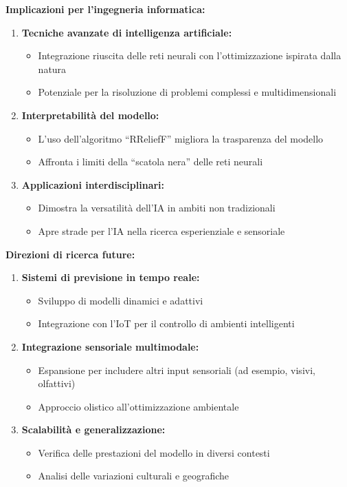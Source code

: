 \textbf{Implicazioni per l'ingegneria informatica:}
\begin{enumerate}
    \item \textbf{Tecniche avanzate di intelligenza artificiale:} 
    \begin{itemize}
        \item Integrazione riuscita delle reti neurali con l'ottimizzazione ispirata dalla natura
        \item Potenziale per la risoluzione di problemi complessi e multidimensionali
    \end{itemize}
    \item \textbf{Interpretabilità del modello:} 
    \begin{itemize}
        \item L'uso dell'algoritmo “RReliefF” migliora la trasparenza del modello
        \item Affronta i limiti della “scatola nera” delle reti neurali
    \end{itemize}
    \item \textbf{Applicazioni interdisciplinari:} 
    \begin{itemize}
        \item Dimostra la versatilità dell'IA in ambiti non tradizionali
        \item Apre strade per l'IA nella ricerca esperienziale e sensoriale
    \end{itemize}
\end{enumerate}

\textbf{Direzioni di ricerca future:}
\begin{enumerate}
    \item \textbf{Sistemi di previsione in tempo reale:} 
    \begin{itemize}
        \item Sviluppo di modelli dinamici e adattivi
        \item Integrazione con l'IoT per il controllo di ambienti intelligenti
    \end{itemize}
    \item \textbf{Integrazione sensoriale multimodale:} 
    \begin{itemize}
        \item Espansione per includere altri input sensoriali (ad esempio, visivi, olfattivi)
        \item Approccio olistico all'ottimizzazione ambientale
    \end{itemize}
    \item \textbf{Scalabilità e generalizzazione:} 
    \begin{itemize}
        \item Verifica delle prestazioni del modello in diversi contesti
        \item Analisi delle variazioni culturali e geografiche
    \end{itemize}
\end{enumerate}

